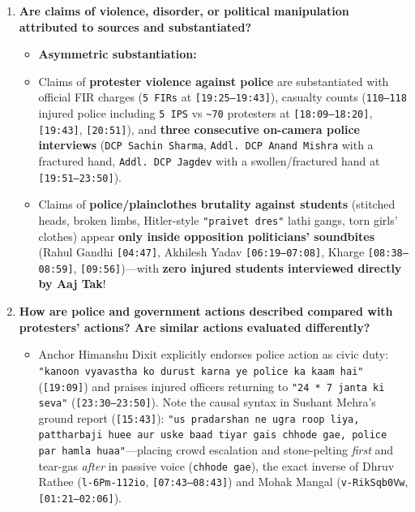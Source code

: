 \documentclass[10pt,a4paper]{article}
\begin{document}
\begin{enumerate}[leftmargin=1.6em, itemsep=4pt, topsep=4pt]
\begin{itemize}[leftmargin=1.4em, itemsep=2pt, topsep=2pt]
  \end{itemize}
  \item \textbf{Are claims of violence, disorder, or political manipulation attributed to sources and substantiated?}
  \begin{itemize}[leftmargin=1.4em, itemsep=2pt, topsep=2pt]
    \item \textbf{Asymmetric substantiation:}
    \item Claims of \textbf{protester violence against police} are substantiated with official FIR charges (\texttt{5 FIRs} at \texttt{[19:25--19:43]}), casualty counts (\texttt{110--118} injured police including \texttt{5 IPS} vs \texttt{\textasciitilde{}70} protesters at \texttt{[18:09--18:20]}, \texttt{[19:43]}, \texttt{[20:51]}), and \textbf{three consecutive on-camera police interviews} (\texttt{DCP Sachin Sharma}, \texttt{Addl. DCP Anand Mishra} with a fractured hand, \texttt{Addl. DCP Jagdev} with a swollen/fractured hand at \texttt{[19:51--23:50]}).
    \item Claims of \textbf{police/plainclothes brutality against students} (stitched heads, broken limbs, Hitler-style \texttt{"praivet dres"} lathi gangs, torn girls' clothes) appear \textbf{only inside opposition politicians' soundbites} (Rahul Gandhi \texttt{[04:47]}, Akhilesh Yadav \texttt{[06:19--07:08]}, Kharge \texttt{[08:38--08:59]}, \texttt{[09:56]})---with \textbf{zero injured students interviewed directly by Aaj Tak}!
  \end{itemize}
  \item \textbf{How are police and government actions described compared with protesters' actions? Are similar actions evaluated differently?}
  \begin{itemize}[leftmargin=1.4em, itemsep=2pt, topsep=2pt]
    \item Anchor Himanshu Dixit explicitly endorses police action as civic duty: \texttt{"kanoon vyavastha ko durust karna ye police ka kaam hai"} (\texttt{[19:09]}) and praises injured officers returning to \texttt{"24 * 7 janta ki seva"} (\texttt{[23:30--23:50]}). Note the causal syntax in Sushant Mehra's ground report (\texttt{[15:43]}): \texttt{"us pradarshan ne ugra roop liya, pattharbaji huee aur uske baad tiyar gais chhode gae, police par hamla huaa"}---placing crowd escalation and stone-pelting \textit{first} and tear-gas \textit{after} in passive voice (\texttt{chhode gae}), the exact inverse of Dhruv Rathee (\texttt{l-6Pm-112io}, \texttt{[07:43--08:43]}) and Mohak Mangal (\texttt{v-RikSqb0Vw}, \texttt{[01:21--02:06]}).
  \end{itemize}

\end{enumerate}
\end{document}

